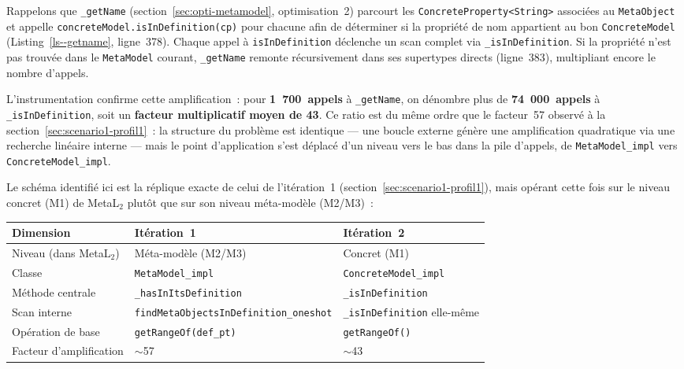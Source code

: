 Rappelons que \texttt{\_getName} (section~\ref{sec:opti-metamodel},
optimisation~2) parcourt les \texttt{ConcreteProperty<String>} associées
au \texttt{MetaObject} et appelle \texttt{concreteModel.isInDefinition(cp)}
pour chacune afin de déterminer si la propriété de nom appartient au bon
\texttt{ConcreteModel} (Listing~\ref{ls--getname}, ligne~378). Chaque
appel à \texttt{isInDefinition} déclenche un scan complet via
\texttt{\_isInDefinition}. Si la propriété n'est pas trouvée dans le
\texttt{MetaModel} courant, \texttt{\_getName} remonte récursivement dans
ses supertypes directs (ligne~383), multipliant encore le nombre d'appels.

L'instrumentation confirme cette amplification~: pour
\textbf{1~700~appels} à \texttt{\_getName}, on dénombre plus de
\textbf{74~000~appels} à \texttt{\_isInDefinition}, soit un
\textbf{facteur multiplicatif moyen de 43}. Ce ratio est du même ordre
que le facteur~57 observé à la section~\ref{sec:scenario1-profil1}~: la
structure du problème est identique --- une boucle externe génère une
amplification quadratique via une recherche linéaire interne --- mais le
point d'application s'est déplacé d'un niveau vers le bas dans la pile
d'appels, de \texttt{MetaModel\_impl} vers \texttt{ConcreteModel\_impl}.

Le schéma identifié ici est la réplique exacte de celui de
l'itération~1 (section~\ref{sec:scenario1-profil1}), mais opérant
cette fois sur le niveau concret (M1) de MetaL$_2$ plutôt que sur
son niveau méta-modèle (M2/M3)~:

\begin{center}
\small
\begin{tabular}{lll}
\hline
\textbf{Dimension} & \textbf{Itération~1} & \textbf{Itération~2} \\
\hline
Niveau (dans MetaL$_2$) & Méta-modèle (M2/M3) & Concret (M1) \\
Classe & \texttt{MetaModel\_impl} & \texttt{ConcreteModel\_impl} \\
Méthode centrale & \texttt{\_hasInItsDefinition} &
\texttt{\_isInDefinition} \\
Scan interne & \texttt{findMetaObjectsInDefinition\_oneshot} &
\texttt{\_isInDefinition} elle-même \\
Opération de base & \texttt{getRangeOf(def\_pt)} & \texttt{getRangeOf()} \\
Facteur d'amplification & $\sim$57 & $\sim$43 \\
\hline
\end{tabular}
\end{center}

